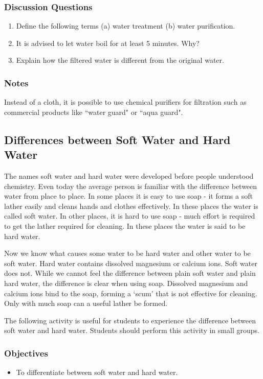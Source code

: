 \subsubsection*{Discussion Questions}
\begin{enumerate}
\item{Define the following terms (a) water treatment (b) water purification.}
\item{It is advised to let water boil for at least 5 minutes. Why?}
\item{Explain how the filtered water is different from the original water.}
\end{enumerate}

\subsubsection*{Notes}
Instead of a cloth, it is possible to use chemical purifiers for filtration such as commercial products like ``water guard" or ``aqua guard".

\subsection{Differences between Soft Water and Hard Water}

The names soft water and hard water were developed before people understood chemistry. Even today the average person is familiar with the difference between water from place to place. In some places it is easy to use soap - it forms a soft lather easily and cleans hands and clothes effectively. In these places the water is called soft water. In other places, it is hard to use soap - much effort is required to get the lather required for cleaning. In these places the water is said to be hard water.

Now we know what causes some water to be hard water and other water to be soft water. Hard water contains dissolved magnesium or calcium ions. Soft water does not. While we cannot feel the difference between plain soft water and plain hard water, the difference is clear when using soap. Dissolved magnesium and calcium ions bind to the soap, forming a `scum' that is not effective for cleaning. Only with much soap can a useful lather be formed.

The following activity is useful for students to experience the difference between soft water and hard water. Students should perform this activity in small groups.

\subsubsection*{Objectives}
\begin{itemize}
\item{To differentiate between soft water and hard water.}
\end{itemize}

